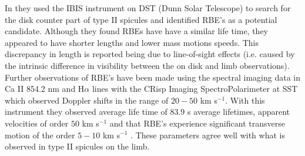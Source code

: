 \documentclass[12pt]{ociamthesis}
\begin{document}
\par In \cite{Langangen2008ApJ} they used the IBIS instrument on DST (Dunn Solar Telescope) to search for the disk counter part of type II spicules and identified RBE's as a potential candidate. Although they found RBEs have have a similar life time, they appeared to have shorter lengths and lower mass motions speeds. This discrepancy in length is reported being due to line-of-sight effects (i.e. caused by the intrinsic difference in visibility between the on disk and limb observations). Further observations of RBE's have been made using the spectral imaging data in Ca II 854.2 nm and H$\alpha$ lines with the CRisp Imaging SpectroPolarimeter at SST which observed Doppler shifts in the range of $20-50$ km s$^{-1}$. With this instrument they observed average life time of $83.9$ s average lifetimes, apparent velocities of order $50$ km s$^{-1}$ and that RBE's experience significant transverse motion of the order $5-10$ km s$^{-1}$ \citep{Rouppe2009ApJ,Sekse2012ApJ}. These parameters agree well with what is observed in type II spicules on the limb. 
\end{document}
